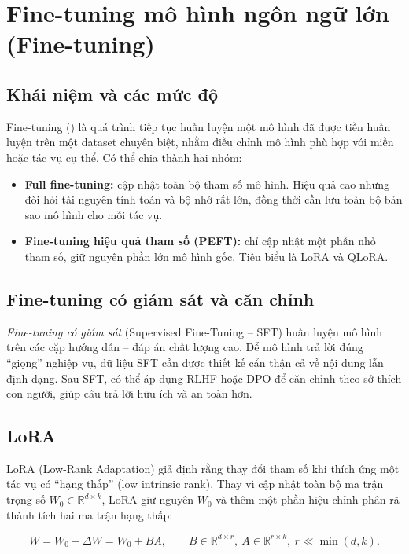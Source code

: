 \section{Fine-tuning mô hình ngôn ngữ lớn (Fine-tuning)}
\label{sec:ft}

\subsection{Khái niệm và các mức độ}

Fine-tuning (\ft) là quá trình tiếp tục huấn luyện một mô hình đã được tiền huấn luyện trên
một dataset chuyên biệt, nhằm điều chỉnh mô hình phù hợp với miền hoặc tác vụ cụ thể.
Có thể chia thành hai nhóm:

\begin{itemize}
  \item \textbf{Full fine-tuning:} cập nhật toàn bộ tham số mô hình.
  Hiệu quả cao nhưng đòi hỏi tài nguyên tính toán và bộ nhớ rất lớn, đồng thời cần lưu
  toàn bộ bản sao mô hình cho mỗi tác vụ.
  \item \textbf{Fine-tuning hiệu quả tham số (PEFT):} chỉ cập nhật một phần nhỏ tham số,
  giữ nguyên phần lớn mô hình gốc. Tiêu biểu là LoRA và QLoRA.
\end{itemize}

\subsection{Fine-tuning có giám sát và căn chỉnh}

\emph{Fine-tuning có giám sát} (Supervised Fine-Tuning -- SFT) huấn luyện mô hình trên các
cặp hướng dẫn -- đáp án chất lượng cao. Để mô hình trả lời đúng ``giọng'' nghiệp vụ, dữ
liệu SFT cần được thiết kế cẩn thận cả về nội dung lẫn định dạng. Sau SFT, có thể áp dụng
RLHF hoặc DPO \cite{rafailov2023dpo} để căn chỉnh theo sở thích con người, giúp câu trả
lời hữu ích và an toàn hơn.

\subsection{LoRA}

LoRA (Low-Rank Adaptation) \cite{hu2021lora} giả định rằng thay đổi tham số khi thích ứng
một tác vụ có ``hạng thấp'' (low intrinsic rank). Thay vì cập nhật toàn bộ ma trận trọng
số $W_0 \in \mathbb{R}^{d \times k}$, LoRA giữ nguyên $W_0$ và thêm một phần hiệu chỉnh
phân rã thành tích hai ma trận hạng thấp:

\begin{equation}
W = W_0 + \Delta W = W_0 + BA, \qquad B \in \mathbb{R}^{d \times r},\ A \in \mathbb{R}^{r \times k},\ r \ll \min(d,k).
\end{equation}

